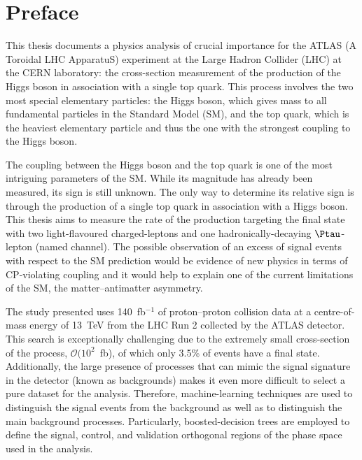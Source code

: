 
\chapter*{Preface}

This thesis documents a physics analysis of crucial importance for the ATLAS (A Toroidal LHC ApparatuS) experiment at the Large Hadron
Collider (LHC) at the CERN laboratory: the cross-section measurement of the production of the Higgs boson in association with a single top
quark. This process involves the two most special elementary particles: the Higgs boson, which gives mass to all fundamental particles in
the Standard Model (SM), and the top quark, which is the heaviest elementary particle and thus the one with the strongest coupling to the Higgs
boson.

The coupling between the Higgs boson and the top quark is one of the most intriguing parameters of the SM. While its magnitude has already been measured, its sign is still unknown. The only way to determine its relative sign is through the production of a single top quark in association with a Higgs boson. This thesis aims to measure the rate of the \tHq production targeting the final state with two light-flavoured charged-leptons 
and one hadronically-decaying $\Ptau$-lepton (named \dileptau channel).
The possible observation of an excess of signal events with respect to the SM prediction would be evidence of new physics in terms of CP-violating coupling and it would help to explain one of the current limitations of the SM, the matter--antimatter asymmetry. 

The study presented uses 140~fb$^{-1}$ of proton--proton collision data at a centre-of-mass energy 
of 13~TeV from the LHC Run 2 collected by the ATLAS detector. 
This search is exceptionally challenging due to the extremely small cross-section of the \tHq process, $\mathcal{O}(10^2$~fb), of
which only 3.5\% of events have a \dileptau final state. Additionally, the large presence of processes that can mimic the signal
signature in the detector (known as backgrounds) makes it even more difficult to select a pure dataset for the analysis. 
Therefore, machine-learning techniques are used to distinguish the \tHq 
signal events from the background as well as to distinguish the main background processes. 
Particularly, boosted-decision trees are employed to define the signal, control, and validation orthogonal regions of 
the phase space used in the analysis. 

